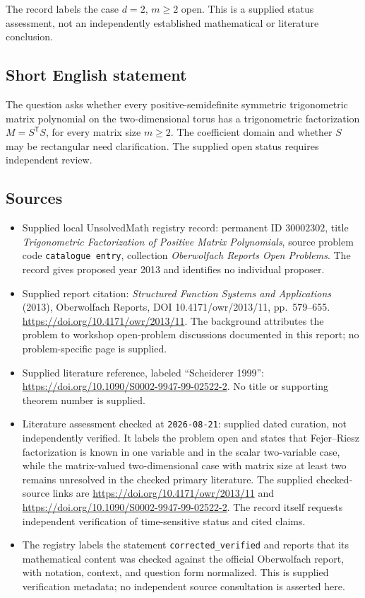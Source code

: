 \documentclass[11pt]{article}
\begin{document}
The record labels the case \(d=2\), \(m\geq2\) open. This is a supplied status assessment, not an independently established mathematical or literature conclusion.
\subsection{Short English statement}
The question asks whether every positive-semidefinite symmetric trigonometric matrix polynomial on the two-dimensional torus has a trigonometric factorization \(M=S^{\mathsf T}S\), for every matrix size \(m\geq2\). The coefficient domain and whether \(S\) may be rectangular need clarification. The supplied open status requires independent review.
\subsection{Sources}
\begin{itemize}
\item Supplied local UnsolvedMath registry record: permanent ID \(30002302\), title \emph{Trigonometric Factorization of Positive Matrix Polynomials}, source problem code \texttt{catalogue entry}, collection \emph{Oberwolfach Reports Open Problems}. The record gives proposed year 2013 and identifies no individual proposer.
\item Supplied report citation: \emph{Structured Function Systems and Applications} (2013), Oberwolfach Reports, DOI 10.4171/owr/2013/11, pp.\ 579--655. \url{https://doi.org/10.4171/owr/2013/11}. The background attributes the problem to workshop open-problem discussions documented in this report; no problem-specific page is supplied.
\item Supplied literature reference, labeled ``Scheiderer 1999'': \url{https://doi.org/10.1090/S0002-9947-99-02522-2}. No title or supporting theorem number is supplied.
\item Literature assessment checked at \texttt{2026-08-21}: supplied dated curation, not independently verified. It labels the problem open and states that Fejer--Riesz factorization is known in one variable and in the scalar two-variable case, while the matrix-valued two-dimensional case with matrix size at least two remains unresolved in the checked primary literature. The supplied checked-source links are \url{https://doi.org/10.4171/owr/2013/11} and \url{https://doi.org/10.1090/S0002-9947-99-02522-2}. The record itself requests independent verification of time-sensitive status and cited claims.
\item The registry labels the statement \texttt{corrected\_verified} and reports that its mathematical content was checked against the official Oberwolfach report, with notation, context, and question form normalized. This is supplied verification metadata; no independent source consultation is asserted here.
\end{itemize}
\end{document}
